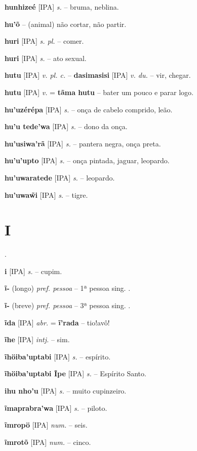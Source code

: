 \textbf{hunhizeé} [IPA] \textit{s.} -- bruma, neblina.

\textbf{hu'õ} -- (animal) não cortar, não partir.

\textbf{huri} [IPA] \textit{s. pl.} -- comer.

\textbf{huri} [IPA] \textit{s.} -- ato sexual.

\textbf{hutu} [IPA] \textit{v. pl. c.} -- \textbf{dasimasisi} [IPA] \textit{v. du.} -- vir, chegar.

\textbf{hutu} [IPA] \textit{v.} = \textbf{tãma hutu} -- bater um pouco e parar logo.

\textbf{hu'uzérépa} [IPA] \textit{s.} -- onça de cabelo comprido, leão.

\textbf{hu'u tede'wa} [IPA] \textit{s.} -- dono da onça.

\textbf{hu'usiwa'rã} [IPA] \textit{s.} -- pantera negra, onça preta.

\textbf{hu'u'upto} [IPA] \textit{s.} -- onça pintada, jaguar, leopardo.

\textbf{hu'uwaratede} [IPA] \textit{s.} -- leopardo.

\textbf{hu'uwaw̃i} [IPA] \textit{s.} -- tigre.



\section*{I}.



\textbf{i} [IPA] \textit{s.} -- cupim.

\textbf{ĩ-} (longo) \textit{pref. pessoa} -- 1ª pessoa sing. .

\textbf{ĩ-} (breve) \textit{pref. pessoa} -- 3ª pessoa sing. .

\textbf{ĩda} [IPA] \textit{abr.} = \textbf{ĩ'rada} -- tio!avô!

\textbf{ĩhe} [IPA] \textit{intj.} -- sim.

\textbf{ĩhöiba'uptabi} [IPA] \textit{s.} -- espírito.

\textbf{ĩhöiba'uptabi Ĩpe} [IPA] \textit{s.} -- Espírito Santo.

\textbf{ihu nho'u} [IPA] \textit{s.} -- muito cupinzeiro.

\textbf{ĩmaprabra’wa} [IPA] \textit{s.} -- 
piloto.

\textbf{ĩmropö} [IPA] \textit{num.} -- seis.

\textbf{ĩmrotõ} [IPA] \textit{num.} -- cinco.

